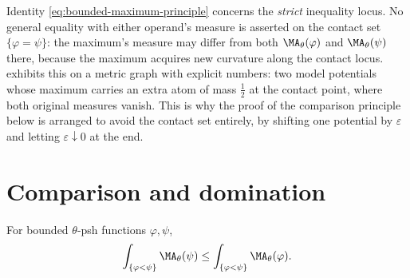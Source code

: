 \begin{remark}
\label{rem:ch25-max-sets}
Identity \eqref{eq:bounded-maximum-principle} concerns the \emph{strict}
inequality locus.  No general equality with either operand's measure is
asserted on the contact set $\{\varphi=\psi\}$: the maximum's measure may
differ from both $\MA_\theta(\varphi)$ and $\MA_\theta(\psi)$ there,
because the maximum acquires new curvature along the contact locus.
 exhibits this on a metric graph with
explicit numbers: two model potentials whose maximum carries an extra atom
of mass $\tfrac12$ at the contact point, where both original measures
vanish.  This is why the proof of the comparison
principle below is arranged to avoid the contact set entirely, by shifting
one potential by $\varepsilon$ and letting $\varepsilon\downarrow0$ at
the end.
\end{remark}

\section{Comparison and domination}
\label{sec:ch25-comparison}

\begin{corollary}
\label{cor:bounded-comparison-principle}
For bounded $\theta$-psh functions $\varphi,\psi$,
\begin{equation}
\label{eq:bounded-comparison-principle}
       \int_{\{\varphi<\psi\}}\MA_\theta(\psi)
       \leq
       \int_{\{\varphi<\psi\}}\MA_\theta(\varphi).
\end{equation}
\end{corollary}

